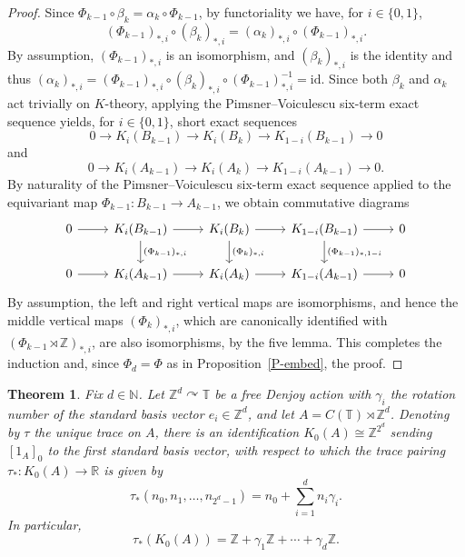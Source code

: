\documentclass[11pt,a4paper,leqno]{amsart}
\newtheorem{thm}{Theorem}[section]
\theoremstyle{definition}
\theoremstyle{remark}
\numberwithin{equation}{section}
\theoremstyle{plain}
\newcommand{\Nb}{\mathbb{N}}
\newcommand{\Zb}{\mathbb{Z}}
\newcommand{\Tb}{\mathbb{T}}
\newcommand{\Rb}{\mathbb{R}}
\begin{document}
\begin{proof}
Since $\Phi_{k-1} \circ \beta_k = \alpha_k \circ \Phi_{k-1}$, by functoriality we have, for $i\in \{0,1\}$,
\[
	(\Phi_{k-1})_{*,i} \circ (\beta_k)_{*,i} = (\alpha_k)_{*,i} \circ (\Phi_{k-1})_{*,i}. 
\]
By assumption, $(\Phi_{k-1})_{*,i}$ is an isomorphism, and $(\beta_k)_{*,i}$ is the identity and thus $(\alpha_k)_{*,i} = (\Phi_{k-1})_{*,i} \circ (\beta_k)_{*,i} \circ (\Phi_{k-1})_{*,i}^{-1} = \mathrm{id}$. Since both $\beta_k$ and $\alpha_k$ act trivially on $K$-theory, applying the Pimsner--Voiculescu six-term exact sequence yields, for $i\in \{0,1\}$, short exact sequences 
\[
	0 \longrightarrow K_i(B_{k-1}) \longrightarrow K_i(B_k) \longrightarrow K_{1-i}(B_{k-1}) \longrightarrow 0
\]
and 
\[
	0 \longrightarrow K_i(A_{k-1}) \longrightarrow K_i(A_k) \longrightarrow K_{1-i}(A_{k-1}) \longrightarrow 0.
\]
By naturality of the Pimsner--Voiculescu six-term exact sequence applied to the equivariant map $\Phi_{k-1} : B_{k-1} \to A_{k-1}$, we obtain commutative diagrams
\[\begin{tikzcd}
	0 & K_i(B_{k-1}) & {K_i(B_k)} & K_{1-i}(B_{k-1}) & 0 \\
	0 & K_i(A_{k-1}) & {K_i(A_k)} & K_{1-i}(A_{k-1}) & 0
	\arrow[from=1-1, to=1-2]
	\arrow[from=1-2, to=1-3]
	\arrow["{(\Phi_{k-1})_{*,i}}", from=1-2, to=2-2]
	\arrow[from=1-3, to=1-4]
	\arrow["{(\Phi_k)_{*,i}}", from=1-3, to=2-3]
	\arrow[from=1-4, to=1-5]
	\arrow["{(\Phi_{k-1})_{*,1-i}}", from=1-4, to=2-4]
	\arrow[from=2-1, to=2-2]
	\arrow[from=2-2, to=2-3]
	\arrow[from=2-3, to=2-4]
	\arrow[from=2-4, to=2-5]
\end{tikzcd}
\]
By assumption, the left and right vertical maps are isomorphisms, and hence the middle vertical maps $(\Phi_k)_{*,i}$, which are canonically identified with $(\Phi_{k-1}\rtimes \Zb)_{*,i}$, are also isomorphisms, by the five lemma. This completes the induction and, since $\Phi_d = \Phi$ as in Proposition~\ref{P-embed}, the proof.     
\end{proof}

\begin{thm}\label{T-Kthy2}
	Fix $d\in \Nb$. Let $\Zb^d \curvearrowright \Tb$ be a free Denjoy action with $\gamma_i$ the rotation number of the standard basis vector $e_i \in \Zb^d$, and let $A = C(\Tb) \rtimes \Zb^d$. Denoting by $\tau$ the unique trace on $A$, there is an identification $K_0(A)\cong \Zb^{2^d}$ sending $[1_A]_0$ to the first standard basis vector, with respect to which the trace pairing $\tau_* : K_0(A) \to \Rb$ is given by 
	 \[
		\tau_*(n_0,n_1,\ldots,n_{2^d - 1}) = n_0 + \sum_{i=1}^d n_i \gamma_i.	
	\]
In particular,
	\[
		\tau_*(K_0(A)) = \Zb + \gamma_1\Zb + \cdots + \gamma_d \Zb.
	\] 
\end{thm}
\end{document}
